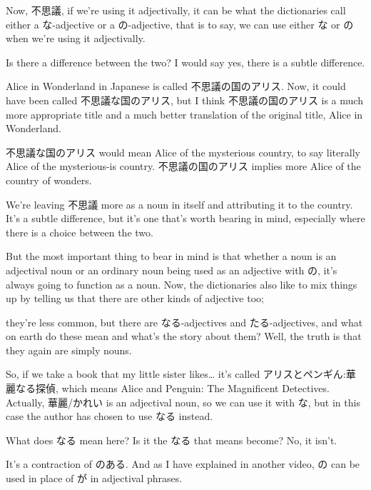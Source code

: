 Now, 不思議, if we're using it adjectivally, it can be what the dictionaries call either a な-adjective or a の-adjective, that is to say, we can use either な or の when we're using it adjectivally.

{}

Is there a difference between the two? I would say yes, there is a subtle difference.

Alice in Wonderland in Japanese is called 不思議の国のアリス. Now, it could have been called 不思議な国のアリス, but I think 不思議の国のアリス is a much more appropriate title and a much better translation of the original title, Alice in Wonderland.

不思議な国のアリス would mean Alice of the mysterious country, to say literally Alice of the mysterious-is country. 不思議の国のアリス implies more Alice of the country of wonders.

We're leaving 不思議 more as a noun in itself and attributing it to the country. It's a subtle difference, but it's one that's worth bearing in mind, especially where there is a choice between the two.

But the most important thing to bear in mind is that whether a noun is an adjectival noun or an ordinary noun being used as an adjective with の, it's always going to function as a noun. Now, the dictionaries also like to mix things up by telling us that there are other kinds of adjective too;

\startsectionlevel[title={なる & たる adjectives (nouns)},reference={なる-たる-adjectives-nouns}]

they're less common, but there are なる-adjectives and たる-adjectives, and what on earth do these mean and what's the story about them? Well, the truth is that they again are simply nouns.

\startsectionlevel[title={なる},reference={なる}]

So, if we take a book that my little sister likes\ldots{} it's called アリスとペンギん:華麗なる探偵, which means Alice and Penguin: The Magnificent Detectives. Actually, 華麗/かれい is an adjectival noun, so we can use it with な, but in this case the author has chosen to use なる instead.

What does なる mean here? Is it the なる that means become? No, it isn't.

It's a contraction of のある. And as I have explained in another video, の can be used in place of が in adjectival phrases.

